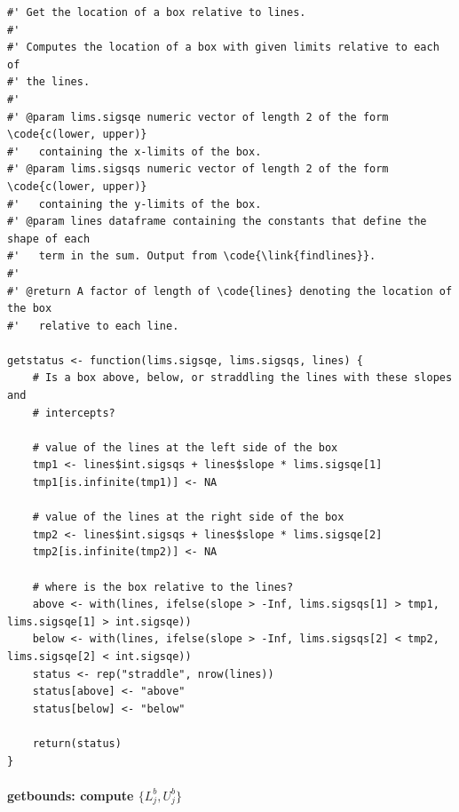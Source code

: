 \documentclass[ejs]{imsart}
\newcommand{\textcompute}{\textsf}
\begin{document}
\begin{verbatim}
#' Get the location of a box relative to lines.
#'
#' Computes the location of a box with given limits relative to each of
#' the lines.
#'
#' @param lims.sigsqe numeric vector of length 2 of the form \code{c(lower, upper)}
#'   containing the x-limits of the box.
#' @param lims.sigsqs numeric vector of length 2 of the form \code{c(lower, upper)}
#'   containing the y-limits of the box.
#' @param lines dataframe containing the constants that define the shape of each
#'   term in the sum. Output from \code{\link{findlines}}.
#'
#' @return A factor of length of \code{lines} denoting the location of the box
#'   relative to each line.

getstatus <- function(lims.sigsqe, lims.sigsqs, lines) {
    # Is a box above, below, or straddling the lines with these slopes and
    # intercepts?

    # value of the lines at the left side of the box
    tmp1 <- lines$int.sigsqs + lines$slope * lims.sigsqe[1]
    tmp1[is.infinite(tmp1)] <- NA

    # value of the lines at the right side of the box
    tmp2 <- lines$int.sigsqs + lines$slope * lims.sigsqe[2]
    tmp2[is.infinite(tmp2)] <- NA

    # where is the box relative to the lines?
    above <- with(lines, ifelse(slope > -Inf, lims.sigsqs[1] > tmp1, lims.sigsqe[1] > int.sigsqe))
    below <- with(lines, ifelse(slope > -Inf, lims.sigsqs[2] < tmp2, lims.sigsqe[2] < int.sigsqe))
    status <- rep("straddle", nrow(lines))
    status[above] <- "above"
    status[below] <- "below"

    return(status)
}
\end{verbatim}

\paragraph{\textcompute{getbounds}: compute $\{L^b_j, U^b_j\}$}
\end{document}
